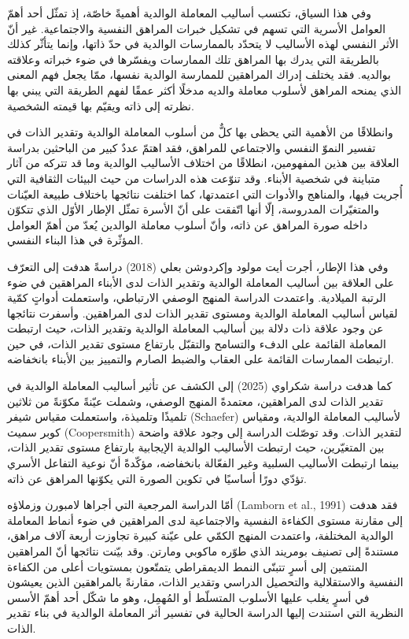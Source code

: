 \documentclass[12pt,oneside]{report}
\newcommand{\en}[1]{\textenglish{#1}}
\begin{document}
وفي هذا السياق، تكتسب أساليب المعاملة الوالدية أهميةً خاصّة، إذ تمثّل أحد أهمّ العوامل الأسرية التي
تسهم في تشكيل خبرات المراهق النفسية والاجتماعية. غير أنّ الأثر النفسي لهذه الأساليب لا يتحدّد
بالممارسات الوالدية في حدّ ذاتها، وإنما يتأثّر كذلك بالطريقة التي يدرك بها المراهق تلك الممارسات
ويفسّرها في ضوء خبراته وعلاقته بوالديه. فقد يختلف إدراك المراهقين للممارسة الوالدية نفسها، ممّا يجعل
فهم المعنى الذي يمنحه المراهق لأسلوب معاملة والديه مدخلًا أكثر عمقًا لفهم الطريقة التي يبني بها نظرته
إلى ذاته ويقيّم بها قيمته الشخصية.

وانطلاقًا من الأهمية التي يحظى بها كلٌّ من أسلوب المعاملة الوالدية وتقدير الذات في تفسير النموّ النفسي
والاجتماعي للمراهق، فقد اهتمّ عددٌ كبير من الباحثين بدراسة العلاقة بين هذين المفهومين، انطلاقًا من
اختلاف الأساليب الوالدية وما قد تتركه من آثار متباينة في شخصية الأبناء. وقد تنوّعت هذه الدراسات من
حيث البيئات الثقافية التي أُجريت فيها، والمناهج والأدوات التي اعتمدتها، كما اختلفت نتائجها باختلاف
طبيعة العيّنات والمتغيّرات المدروسة، إلّا أنها اتّفقت على أنّ الأسرة تمثّل الإطار الأوّل الذي تتكوّن داخله
صورة المراهق عن ذاته، وأنّ أسلوب معاملة الوالدين يُعدّ من أهمّ العوامل المؤثّرة في هذا البناء النفسي.

وفي هذا الإطار، أجرت أيت مولود وإكردوشن بعلي (2018) دراسةً هدفت إلى التعرّف على العلاقة بين
أساليب المعاملة الوالدية وتقدير الذات لدى الأبناء المراهقين في ضوء الرتبة الميلادية. واعتمدت الدراسة
المنهج الوصفي الارتباطي، واستعملت أدواتٍ كمّية لقياس أساليب المعاملة الوالدية ومستوى تقدير الذات لدى
المراهقين. وأسفرت نتائجها عن وجود علاقة ذات دلالة بين أساليب المعاملة الوالدية وتقدير الذات، حيث
ارتبطت المعاملة القائمة على الدفء والتسامح والتقبّل بارتفاع مستوى تقدير الذات، في حين ارتبطت
الممارسات القائمة على العقاب والضبط الصارم والتمييز بين الأبناء بانخفاضه.

كما هدفت دراسة شكراوي (2025) إلى الكشف عن تأثير أساليب المعاملة الوالدية في تقدير الذات لدى
المراهقين، معتمدةً المنهج الوصفي، وشملت عيّنةً مكوّنةً من ثلاثين تلميذًا وتلميذة، واستعملت مقياس شيفر
\en{(Schaefer)} لأساليب المعاملة الوالدية، ومقياس كوبر سميث \en{(Coopersmith)} لتقدير الذات. وقد
توصّلت الدراسة إلى وجود علاقة واضحة بين المتغيّرين، حيث ارتبطت الأساليب الوالدية الإيجابية بارتفاع
مستوى تقدير الذات، بينما ارتبطت الأساليب السلبية وغير الفعّالة بانخفاضه، مؤكّدةً أنّ نوعية التفاعل
الأسري تؤدّي دورًا أساسيًا في تكوين الصورة التي يكوّنها المراهق عن ذاته.

أمّا الدراسة المرجعية التي أجراها لامبورن وزملاؤه \en{(Lamborn et al., 1991)} فقد هدفت إلى مقارنة
مستوى الكفاءة النفسية والاجتماعية لدى المراهقين في ضوء أنماط المعاملة الوالدية المختلفة، واعتمدت
المنهج الكمّي على عيّنة كبيرة تجاوزت أربعة آلاف مراهق، مستندةً إلى تصنيف بومريند الذي طوّره ماكوبي
ومارتن. وقد بيّنت نتائجها أنّ المراهقين المنتمين إلى أسرٍ تتبنّى النمط الديمقراطي يتمتّعون بمستويات أعلى
من الكفاءة النفسية والاستقلالية والتحصيل الدراسي وتقدير الذات، مقارنةً بالمراهقين الذين يعيشون في أسرٍ
يغلب عليها الأسلوب المتسلّط أو المُهمِل، وهو ما شكّل أحد أهمّ الأسس النظرية التي استندت إليها الدراسة
الحالية في تفسير أثر المعاملة الوالدية في بناء تقدير الذات.
\end{document}
